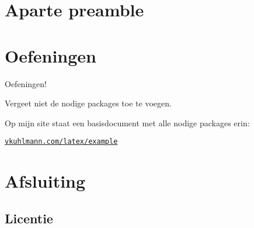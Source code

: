 \documentclass[
    dutch,
    everyoneauthor=true,
    defaultSlideCollection=vincent,
]{../../cursuspresentatie}
\let\placetarget\relax
\let\placetarget\relax
\begin{document}
\def\placetarget{\hypertarget{LaTeXDefinities}{}}

\begin{frame}
\end{frame}



\section{Aparte preamble}

\def\placetarget{\hypertarget{apartePreamble}{}}

\begin{frame}
\end{frame}


\section{Oefeningen}

\def\placetarget{\hypertarget{oefeningen2}{}}

\begin{frame}
    \begin{center}
        {\LARGE Oefeningen!}
        \vspace{30pt}

        Vergeet niet de nodige packages toe te voegen.
        
        Op mijn site
        staat een basisdocument met alle nodige packages erin:

        \href{https://vkuhlmann.com/latex/example}{\nolinkurl{vkuhlmann.com/latex/example}}
    \end{center}
\end{frame}





\section{Afsluiting}

\subsection{Licentie}
    
\end{document}

